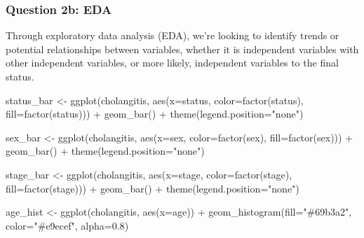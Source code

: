 \documentclass[
]{article}
\newenvironment{Shaded}{\begin{snugshade}}{\end{snugshade}}
\newcommand{\AttributeTok}[1]{\textcolor[rgb]{0.77,0.63,0.00}{#1}}
\newcommand{\FloatTok}[1]{\textcolor[rgb]{0.00,0.00,0.81}{#1}}
\newcommand{\FunctionTok}[1]{\textcolor[rgb]{0.00,0.00,0.00}{#1}}
\newcommand{\NormalTok}[1]{#1}
\newcommand{\OtherTok}[1]{\textcolor[rgb]{0.56,0.35,0.01}{#1}}
\newcommand{\SpecialCharTok}[1]{\textcolor[rgb]{0.00,0.00,0.00}{#1}}
\newcommand{\StringTok}[1]{\textcolor[rgb]{0.31,0.60,0.02}{#1}}
\begin{document}
\hypertarget{question-2b-eda}{%
\subsubsection{Question 2b: EDA}\label{question-2b-eda}}

Through exploratory data analysis (EDA), we're looking to identify
trends or potential relationships between variables, whether it is
independent variables with other independent variables, or more likely,
independent variables to the final status.

\begin{Shaded}
\begin{Highlighting}[]
\NormalTok{status\_bar }\OtherTok{\textless{}{-}} \FunctionTok{ggplot}\NormalTok{(cholangitis, }\FunctionTok{aes}\NormalTok{(}\AttributeTok{x=}\NormalTok{status, }\AttributeTok{color=}\FunctionTok{factor}\NormalTok{(status), }\AttributeTok{fill=}\FunctionTok{factor}\NormalTok{(status))) }\SpecialCharTok{+}
  \FunctionTok{geom\_bar}\NormalTok{() }\SpecialCharTok{+}
  \FunctionTok{theme}\NormalTok{(}\AttributeTok{legend.position=}\StringTok{"none"}\NormalTok{)}

\NormalTok{sex\_bar }\OtherTok{\textless{}{-}} \FunctionTok{ggplot}\NormalTok{(cholangitis, }\FunctionTok{aes}\NormalTok{(}\AttributeTok{x=}\NormalTok{sex, }\AttributeTok{color=}\FunctionTok{factor}\NormalTok{(sex), }\AttributeTok{fill=}\FunctionTok{factor}\NormalTok{(sex))) }\SpecialCharTok{+}
  \FunctionTok{geom\_bar}\NormalTok{() }\SpecialCharTok{+} 
  \FunctionTok{theme}\NormalTok{(}\AttributeTok{legend.position=}\StringTok{"none"}\NormalTok{)}

\NormalTok{stage\_bar }\OtherTok{\textless{}{-}} \FunctionTok{ggplot}\NormalTok{(cholangitis, }\FunctionTok{aes}\NormalTok{(}\AttributeTok{x=}\NormalTok{stage, }\AttributeTok{color=}\FunctionTok{factor}\NormalTok{(stage), }\AttributeTok{fill=}\FunctionTok{factor}\NormalTok{(stage))) }\SpecialCharTok{+}
  \FunctionTok{geom\_bar}\NormalTok{() }\SpecialCharTok{+} 
  \FunctionTok{theme}\NormalTok{(}\AttributeTok{legend.position=}\StringTok{"none"}\NormalTok{)}

\NormalTok{age\_hist }\OtherTok{\textless{}{-}} \FunctionTok{ggplot}\NormalTok{(cholangitis, }\FunctionTok{aes}\NormalTok{(}\AttributeTok{x=}\NormalTok{age)) }\SpecialCharTok{+}
  \FunctionTok{geom\_histogram}\NormalTok{(}\AttributeTok{fill=}\StringTok{"\#69b3a2"}\NormalTok{, }\AttributeTok{color=}\StringTok{"\#e9ecef"}\NormalTok{, }\AttributeTok{alpha=}\FloatTok{0.8}\NormalTok{)}


\end{Highlighting}
\end{Shaded}
\end{document}
